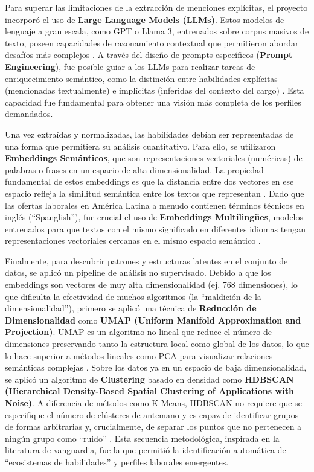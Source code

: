 Para superar las limitaciones de la extracción de menciones explícitas, el proyecto incorporó el uso de \textbf{Large Language Models (LLMs)}. Estos modelos de lenguaje a gran escala, como GPT o Llama 3, entrenados sobre corpus masivos de texto, poseen capacidades de razonamiento contextual que permitieron abordar desafíos más complejos \cite{herandi2024}. A través del diseño de prompts específicos (\textbf{Prompt Engineering}), fue posible guiar a los LLMs para realizar tareas de enriquecimiento semántico, como la distinción entre habilidades explícitas (mencionadas textualmente) e implícitas (inferidas del contexto del cargo) \cite{nguyen2024}. Esta capacidad fue fundamental para obtener una visión más completa de los perfiles demandados.

Una vez extraídas y normalizadas, las habilidades debían ser representadas de una forma que permitiera su análisis cuantitativo. Para ello, se utilizaron \textbf{Embeddings Semánticos}, que son representaciones vectoriales (numéricas) de palabras o frases en un espacio de alta dimensionalidad. La propiedad fundamental de estos embeddings es que la distancia entre dos vectores en ese espacio refleja la similitud semántica entre los textos que representan \cite{kavas2024}. Dado que las ofertas laborales en América Latina a menudo contienen términos técnicos en inglés (``Spanglish''), fue crucial el uso de \textbf{Embeddings Multilingües}, modelos entrenados para que textos con el mismo significado en diferentes idiomas tengan representaciones vectoriales cercanas en el mismo espacio semántico \cite{echeverria2022}.

Finalmente, para descubrir patrones y estructuras latentes en el conjunto de datos, se aplicó un pipeline de análisis no supervisado. Debido a que los embeddings son vectores de muy alta dimensionalidad (ej. 768 dimensiones), lo que dificulta la efectividad de muchos algoritmos (la ``maldición de la dimensionalidad''), primero se aplicó una técnica de \textbf{Reducción de Dimensionalidad} como \textbf{UMAP (Uniform Manifold Approximation and Projection)}. UMAP es un algoritmo no lineal que reduce el número de dimensiones preservando tanto la estructura local como global de los datos, lo que lo hace superior a métodos lineales como PCA para visualizar relaciones semánticas complejas \cite{lukauskas2023}. Sobre los datos ya en un espacio de baja dimensionalidad, se aplicó un algoritmo de \textbf{Clustering} basado en densidad como \textbf{HDBSCAN (Hierarchical Density-Based Spatial Clustering of Applications with Noise)}. A diferencia de métodos como K-Means, HDBSCAN no requiere que se especifique el número de clústeres de antemano y es capaz de identificar grupos de formas arbitrarias y, crucialmente, de separar los puntos que no pertenecen a ningún grupo como ``ruido'' \cite{lukauskas2023}. Esta secuencia metodológica, inspirada en la literatura de vanguardia, fue la que permitió la identificación automática de ``ecosistemas de habilidades'' y perfiles laborales emergentes.


